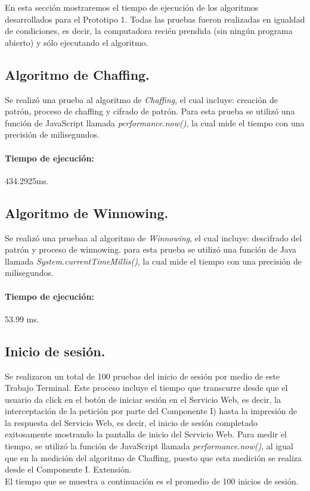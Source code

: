 \documentclass[12pt, a4paper, titlepage]{report}
\begin{document}
	        En esta sección mostraremos el tiempo de ejecución de los algoritmos desarrollados para el Prototipo 1. Todas las pruebas fueron realizadas en igualdad de condiciones, es decir, la computadora recién prendida (sin ningún programa abierto) y sólo ejecutando el algoritmo.
	        
	        \subsection{Algoritmo de Chaffing.}
	        
	            Se realizó una prueba al algoritmo de \textit{Chaffing}, el cual incluye: creación de patrón, proceso de chaffing y cifrado de patrón. Para esta prueba se utilizó una función de JavaScript llamada \textit{performance.now()}, la cual mide el tiempo con una precisión de milisegundos.\\
	            
	            \paragraph{Tiempo de ejecución: }  434.2925ms.\\
	            
	        \subsection{Algoritmo de Winnowing.}
	        
	            Se realizó una pruebaa al algoritmo de \textit{Winnowing}, el cual incluye: descifrado del patrón y proceso de winnowing. para esta prueba se utilizó una función de Java llamada \textit{System.currentTimeMillis()}, la cual mide el tiempo con una precisión de milisegundos.\\
	            
	            \paragraph{Tiempo de ejecución: } 53.99 ms.\\
	            
	        \subsection{Inicio de sesión.}
	    
	            Se realizaron un total de 100 pruebas del inicio de sesión por medio de este Trabajo Terminal. Este proceso incluye el tiempo que transcurre desde que el usuario da click en el botón de iniciar sesión en el Servicio Web, es decir, la interceptación de la petición por parte del Componente I) hasta la impresión de la respuesta del Servicio Web, es decir, el inicio de sesión completado exitosamente mostrando la pantalla de inicio del Servicio Web.
	            Para medir el tiempo, se utilizó la función de JavaScript llamada \textit{performance.now()}, al igual que en la medición del algoritmo de Chaffing, puesto que esta medición se realiza desde el Componente I. Extensión.\\
	            El tiempo que se muestra a continuación es el promedio de 100 inicios de sesión.
	            
\end{document}

